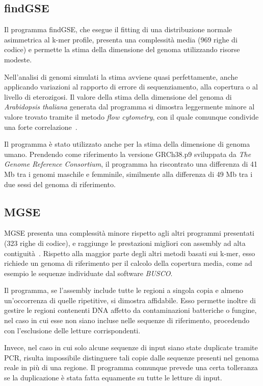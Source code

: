 \documentclass[crop=false, class=book]{standalone}
\begin{document}
	
	\subsection{findGSE}
	Il programma findGSE, che esegue il fitting di una distribuzione normale asimmetrica al k-mer profile, presenta una complessità media (969 righe di codice) e permette la stima della dimensione del genoma utilizzando risorse modeste. 
	
	Nell'analisi di genomi simulati la stima avviene quasi perfettamente, anche applicando variazioni al rapporto di errore di sequenziamento, alla copertura o al livello di eterozigosi. Il valore della stima della dimensione del genoma di \textit{Arabidopsis thaliana} generata dal programma si dimostra leggermente minore al valore trovato tramite il metodo \textit{flow cytometry}, con il quale comunque condivide una forte correlazione~\cite{sun2017findGSE}. 
	
	Il programma è stato utilizzato anche per la stima della dimensione di genoma umano. Prendendo come riferimento la versione GRCh38.p9 sviluppata da \textit{The Genome Reference Consortium}, il programma ha riscontrato una differenza di 41 Mb tra i genomi maschile e femminile, similmente alla differenza di 49 Mb tra i due sessi del genoma di riferimento.
	
	\subsection{MGSE}
	MGSE presenta una complessità minore rispetto agli altri programmi presentati (323 righe di codice), e raggiunge le prestazioni migliori con assembly ad alta contiguità~\cite{pucker2019MGSE}. Rispetto alla maggior parte degli altri metodi basati sui k-mer, esso richiede un genoma di riferimento per il calcolo della copertura media, come ad esempio le sequenze individuate dal software \textit{BUSCO}. 
	
	Il programma, se l'assembly include tutte le regioni a singola copia e almeno un'occorrenza di quelle ripetitive, si dimostra affidabile. Esso permette inoltre di gestire le regioni contenenti DNA affetto da contaminazioni batteriche o fungine, nel caso in cui esse non siano incluse nelle sequenze di riferimento, procedendo con l'esclusione delle letture corrispondenti. 
	
	Invece, nel caso in cui solo alcune sequenze di input siano state duplicate tramite PCR, risulta impossibile distinguere tali copie dalle sequenze presenti nel genoma reale in più di una regione. Il programma comunque prevede una certa tolleranza se la duplicazione è stata fatta equamente su tutte le letture di input.


	
\end{document}
